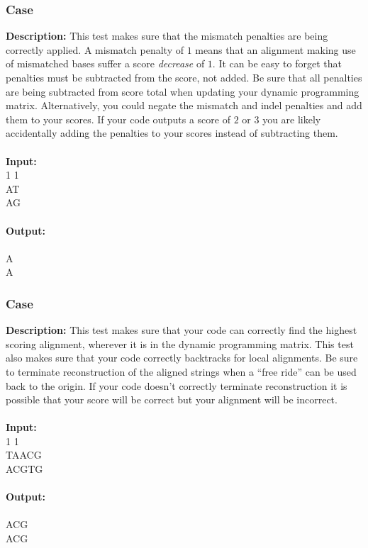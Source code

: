 \documentclass{article}
\newcommand{\code}[1]{{\fontfamily{pcr}\selectfont #1}}
\begin{document}
\subsubsection*{Case }
\hline \vspace{5}
\textbf{Description:} This test makes sure that the mismatch penalties are being correctly applied. A mismatch penalty of $1$ means that an alignment making use of mismatched bases suffer a score \emph{decrease} of $1$. It can be easy to forget that penalties must be subtracted from the score, not added. Be sure that all penalties are being subtracted from score total when updating your dynamic programming matrix. Alternatively, you could negate the mismatch and indel penalties and add them to your scores. If your code outputs a score of $2$ or $3$ you are likely accidentally adding the penalties to your scores instead of subtracting them.\\ \\
\noindent \textbf{Input:}\\
\code{1 1 1\\AT\\AG}\\ \\
\noindent \textbf{Output:}\\
\code{1\\A\\A}

\subsubsection*{Case }
\hline \vspace{5}
\textbf{Description:} This test makes sure that your code can correctly find the highest scoring alignment, wherever it is in the dynamic programming matrix. This test also makes sure that your code correctly backtracks for local alignments. Be sure to terminate reconstruction of the aligned strings when a “free ride” can be used back to the origin. If your code doesn’t correctly terminate reconstruction it is possible that your score will be correct but your alignment will be incorrect.\\ \\
\noindent \textbf{Input:}\\
\code{1 1 1\\TAACG\\ACGTG}\\ \\
\noindent \textbf{Output:}\\
\code{3\\ACG\\ACG}
\pagebreak
\end{document}

